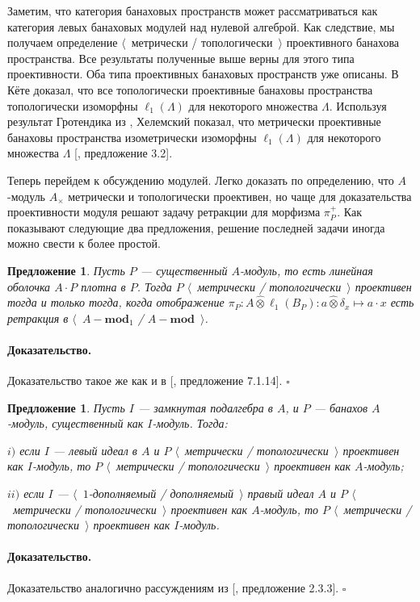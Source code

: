 \documentclass[12pt]{article}
\newcommand{\projtens}{\mathbin{\widehat{\otimes}}}
\newtheorem{proposition}[theorem]{Предложение}
\renewenvironment{proof}{\paragraph{Доказательство.}}{\hfill$\square$\medskip}
\begin{document}
Заметим, что категория банаховых пространств может рассматриваться как категория левых банаховых модулей над нулевой алгеброй. Как следствие, мы получаем определение $\langle$~метрически / топологически~$\rangle$ проективного банахова пространства. Все результаты полученные выше верны для этого типа проективности. Оба типа проективных банаховых пространств уже описаны. В \cite{KotheTopProjBanSp} Кёте доказал, что все топологически проективные банаховы пространства топологически изоморфны $\ell_1(\Lambda)$ для некоторого множества $\Lambda$. Используя результат Гротендика из \cite{GrothMetrProjFlatBanSp}, Хелемский показал, что метрически проективные банаховы пространства изометрически изоморфны $\ell_1(\Lambda)$ для некоторого множества $\Lambda$ [\cite{HelMetrFrQMod}, предложение 3.2].

Теперь перейдем к обсуждению модулей. Легко доказать по определению, 
что $A$-модуль $A_\times$ метрически и топологически проективен, но чаще для доказательства проективности модуля решают задачу ретракции для морфизма $\pi_P^+$. Как показывают следующие два предложения, решение последней задачи иногда можно свести к более простой. 

\begin{proposition}\label{NonDegenMetTopProjCharac} Пусть $P$ --- существенный $A$-модуль, то есть линейная оболочка $A\cdot P$ плотна в $P$. Тогда $P$ $\langle$~метрически / топологически~$\rangle$ проективен тогда и только тогда, когда отображение $\pi_P:A\projtens\ell_1(B_P):a\projtens\delta_x\mapsto a\cdot x$ есть ретракция в $\langle$~$A-\mathbf{mod}_1$ / $A-\mathbf{mod}$~$\rangle$.
\end{proposition}
\begin{proof} Доказательство такое же как и в [\cite{HelBanLocConvAlg}, предложение 7.1.14].
\end{proof}

\begin{proposition}\label{MetTopProjUnderChangeOfAlg} Пусть $I$ --- замкнутая подалгебра в $A$, и $P$ --- банахов $A$-модуль, существенный как $I$-модуль. Тогда:

$i)$ если $I$ --- левый идеал в $A$ и $P$ $\langle$~метрически / топологически~$\rangle$ проективен как $I$-модуль, то $P$ $\langle$~метрически / топологически~$\rangle$ проективен как $A$-модуль;

$ii)$ если $I$ ---  $\langle$~$1$-дополняемый / дополняемый~$\rangle$ правый идеал $A$ и $P$ $\langle$~метрически / топологически~$\rangle$ проективен как $A$-модуль, то $P$ $\langle$~метрически / топологически~$\rangle$ проективен как $I$-модуль.
\end{proposition}
\begin{proof} Доказательство аналогично рассуждениям из [\cite{RamsHomPropSemgroupAlg}, предложение 2.3.3].
\end{proof}
\end{document}

